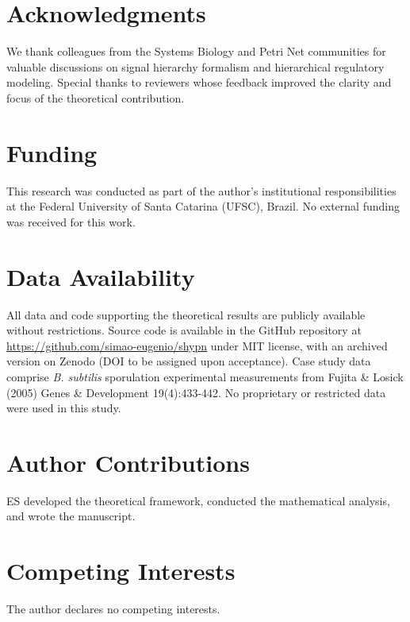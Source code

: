 \documentclass[10pt,letterpaper]{article}
\begin{document}
\section*{Acknowledgments}

We thank colleagues from the Systems Biology and Petri Net communities for valuable discussions on signal hierarchy formalism and hierarchical regulatory modeling. Special thanks to reviewers whose feedback improved the clarity and focus of the theoretical contribution.

\section*{Funding}

This research was conducted as part of the author's institutional responsibilities at the Federal University of Santa Catarina (UFSC), Brazil. No external funding was received for this work.

\section*{Data Availability}

All data and code supporting the theoretical results are publicly available without restrictions. Source code is available in the GitHub repository at \url{https://github.com/simao-eugenio/shypn} under MIT license, with an archived version on Zenodo (DOI to be assigned upon acceptance). Case study data comprise \textit{B. subtilis} sporulation experimental measurements from Fujita \& Losick (2005) Genes \& Development 19(4):433-442. No proprietary or restricted data were used in this study.

\section*{Author Contributions}

ES developed the theoretical framework, conducted the mathematical analysis, and wrote the manuscript.

\section*{Competing Interests}

The author declares no competing interests.



\end{document}
